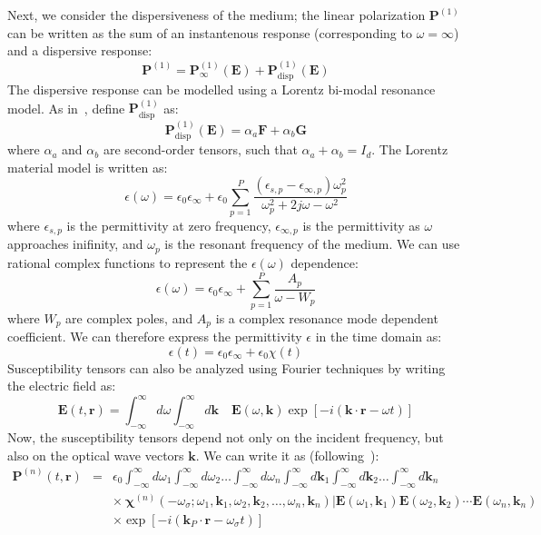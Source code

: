 \documentclass{article}[12pt]
\theoremstyle{plain}
\begin{document}
Next, we consider the dispersiveness of the medium; the linear polarization $\mathbf{P}^{(1)}$ can
be written as the sum of an instantenous response (corresponding to $\omega=\infty$) and a
dispersive response:
\begin{equation}
\mathbf{P}^{(1)} = \mathbf{P}^{(1)}_{\infty}(\mathbf{E}) + \mathbf{P}^{(1)}_{\mathrm{disp}}(\mathbf{E}) \label{eqn:electric_displacement_3}
\end{equation}
The dispersive response can be modelled using a Lorentz bi-modal resonance model. 
As in~\cite{bourgeade_and_nkonga_siam_2005}, define $\mathbf{P}^{(1)}_\mathrm{disp}$ as:
\begin{equation}
\mathbf{P}^{(1)}_\mathrm{disp}(\mathbf{E}) = \alpha_a \mathbf{F} + \alpha_b \mathbf{G} \label{eqn:alpha_a_b}
\end{equation}
where $\alpha_a$ and $\alpha_b$ are second-order tensors, such that $\alpha_a+\alpha_b = I_d$.
The Lorentz material
model is written as:
\begin{equation}
\epsilon(\omega) = \epsilon_0\epsilon_\infty + \epsilon_0 \sum_{p=1}^P \frac{(\epsilon_{s,p}-\epsilon_{\infty,p})\omega_p^2}
{\omega_p^2 + 2j\omega - \omega^2}
\label{eqn:lorentz_material}
\end{equation}
where $\epsilon_{s,p}$ is the permittivity at zero frequency, $\epsilon_{\infty,p}$ is the
permittivity as $\omega$ approaches inifinity, and $\omega_p$ is the resonant frequency of
the medium. 
We can use rational complex functions to represent the $\epsilon(\omega)$ dependence:
\[
\epsilon(\omega) = \epsilon_0\epsilon_\infty + \sum_{p=1}^P \frac{A_p}{\omega-W_p}
\]
where $W_p$ are complex poles, and $A_p$ is a complex resonance mode dependent coefficient.
We can therefore express the permittivity $\epsilon$ in the time domain as:
\[
\epsilon(t) = \epsilon_0\epsilon_\infty + \epsilon_0\chi(t)
\]
Susceptibility tensors can also be analyzed using Fourier techniques by writing the electric field
as:
\begin{equation}
\mathbf{E}(t,\mathbf{r}) = \int_{-\infty}^\infty d\omega \int_{-\infty}^\infty d\mathbf{k} \quad
\mathbf{E}(\omega,\mathbf{k}) \exp[-i(\mathbf{k}\cdot\mathbf{r} - \omega t)]
\end{equation}
Now, the susceptibility tensors depend not only on the incident frequency, but also on the optical wave
vectors $\mathbf{k}$. We can write it as (following~\cite{butcher1991elements}):
\begin{eqnarray}
\mathbf{P}^{(n)}(t,\mathbf{r}) & = & \epsilon_0 \int_{-\infty}^\infty d\omega_1 \int_{-\infty}^\infty d\omega_2 \ldots \int_{-\infty}^\infty d\omega_n
\int_{-\infty}^\infty d\mathbf{k}_1 \int_{-\infty}^\infty d\mathbf{k}_2 \ldots \int_{-\infty}^\infty d\mathbf{k}_n \nonumber \\
& & \times\ \mathbf{\chi}^{(n)}(-\omega_{\sigma};\omega_1,\mathbf{k}_1,\omega_2,\mathbf{k}_2,\ldots,\omega_n,\mathbf{k}_n)|
\mathbf{E}(\omega_1,\mathbf{k}_1)\mathbf{E}(\omega_2,\mathbf{k}_2)\cdots\mathbf{E}(\omega_n,\mathbf{k}_n) \\
& & \times \exp[-i(\mathbf{k}_P\cdot\mathbf{r}-\omega_{\sigma}t)] \nonumber %
\end{eqnarray}
\end{document}
